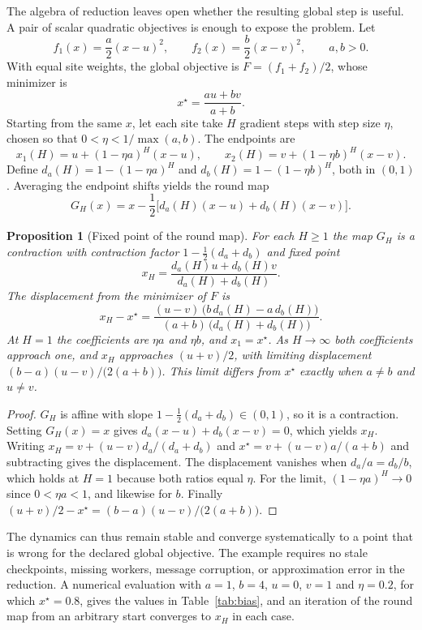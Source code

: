 \documentclass[11pt]{article}
\newtheorem{proposition}{Proposition}
\theoremstyle{definition}
\theoremstyle{remark}
\begin{document}
The algebra of reduction leaves open whether the resulting global step is useful. A pair of scalar quadratic objectives is enough to expose the problem. Let
\[
f_1(x)=\frac a2(x-u)^2,\qquad
f_2(x)=\frac b2(x-v)^2,\qquad a,b>0.
\]
With equal site weights, the global objective is $F=(f_1+f_2)/2$, whose minimizer is
\[
x^\star=\frac{au+bv}{a+b}.
\]
Starting from the same $x$, let each site take $H$ gradient steps with step size $\eta$, chosen so that $0<\eta<1/\max(a,b)$. The endpoints are
\[
x_1(H)=u+(1-\eta a)^H(x-u),\qquad
x_2(H)=v+(1-\eta b)^H(x-v).
\]
Define $d_a(H)=1-(1-\eta a)^H$ and $d_b(H)=1-(1-\eta b)^H$, both in $(0,1)$. Averaging the endpoint shifts yields the round map
\[
G_H(x)=x-\frac12\bigl[d_a(H)(x-u)+d_b(H)(x-v)\bigr].
\]

\begin{proposition}[Fixed point of the round map]\label{prop:fixedpoint}
For each $H\ge 1$ the map $G_H$ is a contraction with contraction factor $1-\tfrac12(d_a+d_b)$ and fixed point
\[
x_H=\frac{d_a(H)u+d_b(H)v}{d_a(H)+d_b(H)}.
\]
The displacement from the minimizer of $F$ is
\[
x_H-x^\star=\frac{(u-v)\,\bigl(b\,d_a(H)-a\,d_b(H)\bigr)}{(a+b)\,\bigl(d_a(H)+d_b(H)\bigr)}.
\]
At $H=1$ the coefficients are $\eta a$ and $\eta b$, and $x_1=x^\star$. As $H\to\infty$ both coefficients approach one, and $x_H$ approaches $(u+v)/2$, with limiting displacement $(b-a)(u-v)/\bigl(2(a+b)\bigr)$. This limit differs from $x^\star$ exactly when $a\ne b$ and $u\ne v$.
\end{proposition}

\begin{proof}
$G_H$ is affine with slope $1-\tfrac12(d_a+d_b)\in(0,1)$, so it is a contraction. Setting $G_H(x)=x$ gives $d_a(x-u)+d_b(x-v)=0$, which yields $x_H$. Writing $x_H=v+(u-v)d_a/(d_a+d_b)$ and $x^\star=v+(u-v)a/(a+b)$ and subtracting gives the displacement. The displacement vanishes when $d_a/a=d_b/b$, which holds at $H=1$ because both ratios equal $\eta$. For the limit, $(1-\eta a)^H\to0$ since $0<\eta a<1$, and likewise for $b$. Finally $(u+v)/2-x^\star=(b-a)(u-v)/\bigl(2(a+b)\bigr)$.
\end{proof}

The dynamics can thus remain stable and converge systematically to a point that is wrong for the declared global objective. The example requires no stale checkpoints, missing workers, message corruption, or approximation error in the reduction. A numerical evaluation with $a=1$, $b=4$, $u=0$, $v=1$ and $\eta=0.2$, for which $x^\star=0.8$, gives the values in Table~\ref{tab:bias}, and an iteration of the round map from an arbitrary start converges to $x_H$ in each case.
\end{document}
